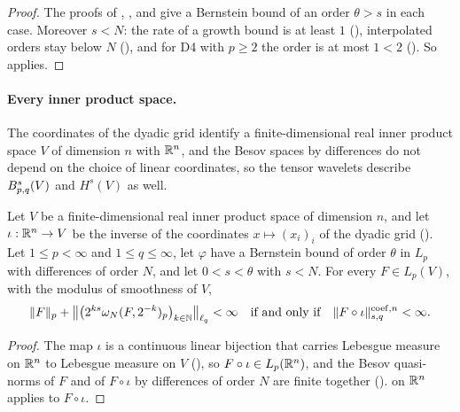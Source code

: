 \begin{proof}
\leanok
{}
The proofs of , ,
 and  give a Bernstein bound of an order
$\theta > s$ in each case. Moreover $s < N$: the rate of a growth bound is at least $1$
(), interpolated orders stay below $N$
(), and for D4 with $p \geq 2$ the order is at most $1 < 2$
(). So  applies.
\end{proof}

\paragraph{Every inner product space.}
The coordinates of the dyadic grid identify a finite-dimensional real inner product space $V$ of
dimension $n$ with $\mathbb{R}^n$, and the Besov spaces by differences do not depend on the choice of
linear coordinates, so the tensor wavelets describe $B^{s}_{p,q}(V)$ and $H^s(V)$ as well.

\begin{theorem}
\label{thm:daub-rd-besov-grid}
\leanok
{}
Let $V$ be a finite-dimensional real inner product space of dimension $n$, and let
$\iota : \mathbb{R}^n \to V$ be the inverse of the coordinates $x \mapsto (x_i)_i$ of the dyadic grid
(). Let $1 \leq p < \infty$ and $1 \leq q \leq \infty$, let $\varphi$
have a Bernstein bound of order $\theta$ in $L_p$ with differences of order $N$, and let
$0 < s < \theta$ with $s < N$. For every $F \in L_p(V)$, with the modulus of smoothness of $V$,
\[
  \|F\|_p + \bigl\|\bigl(2^{ks} \omega_N(F, 2^{-k})_p\bigr)_{k \in \mathbb{N}}\bigr\|_{\ell_q} < \infty
  \quad\text{if and only if}\quad \|F \circ \iota\|^{\mathrm{coef},n}_{s,q} < \infty .
\]
\end{theorem}

\begin{proof}
\leanok
{}
The map $\iota$ is a continuous linear bijection that carries Lebesgue measure on $\mathbb{R}^n$ to
Lebesgue measure on $V$ (), so $F \circ \iota \in L_p(\mathbb{R}^n)$, and the
Besov quasi-norms of $F$ and of $F \circ \iota$ by differences of order $N$ are finite together
().  on $\mathbb{R}^n$ applies to $F \circ \iota$.
\end{proof}

